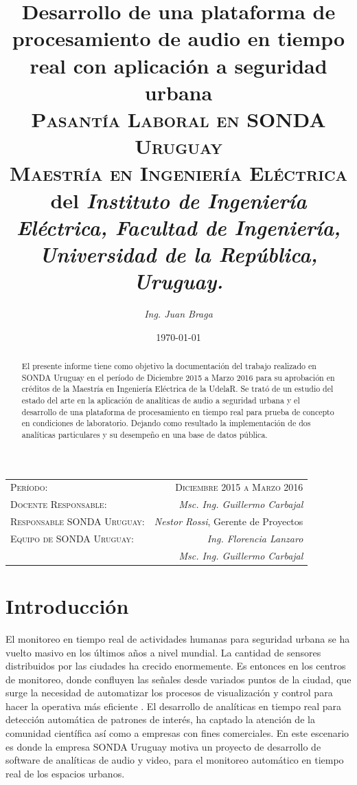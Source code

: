 \documentclass{article}
\title{\textbf{Desarrollo de una plataforma de procesamiento de audio en tiempo real con aplicación a seguridad urbana}\\ \textsc{Pasantía Laboral en SONDA Uruguay}\\
\large \textsc{Maestría en Ingeniería Eléctrica} del \textit{Instituto de Ingeniería Eléctrica, Facultad de Ingeniería, Universidad de la República, Uruguay.}}
\author{\textit{Ing. Juan Braga}}
\date{\today}
\begin{document}
\maketitle 

\begin{center}
\begin{tabular}{l r}
\medskip
\textsc{Período:} & \textsc{Diciembre 2015 a Marzo 2016}\\ %
\textsc{Docente Responsable:} & \textit{Msc. Ing. Guillermo Carbajal} \\ 
\textsc{Responsable SONDA Uruguay:} & \textit{Nestor Rossi}, Gerente de Proyectos  \\
\textsc{Equipo de SONDA Uruguay:} & \textit{Ing. Florencia Lanzaro} \\ & \textit{Msc. Ing. Guillermo Carbajal} \\ 
\end{tabular}
\end{center}


\begin{abstract}
El presente informe tiene como objetivo la documentación del trabajo realizado en SONDA Uruguay en el período de Diciembre 2015 a Marzo 2016 para su aprobación en créditos de la Maestría en Ingeniería Eléctrica de la UdelaR. Se trató de un estudio del estado del arte en la aplicación de analíticas de audio a seguridad urbana y el desarrollo de una plataforma de procesamiento en tiempo real para prueba de concepto en condiciones de laboratorio. Dejando como resultado la implementación de dos analíticas particulares y su desempeño en una base de datos pública.
\end{abstract}


\section{Introducción}
El monitoreo en tiempo real de actividades humanas para seguridad urbana se ha vuelto masivo en los últimos años a nivel mundial. La cantidad de sensores distribuidos por las ciudades ha crecido enormemente. Es entonces en los centros de monitoreo, donde confluyen las señales desde variados puntos de la ciudad, que surge la necesidad de automatizar los procesos de visualización y control para hacer la operativa más eficiente \citep{crocco2014audio}. El desarrollo de analíticas en tiempo real para detección automática de patrones de interés, ha captado la atención de la comunidad científica así como a empresas con fines comerciales. En este escenario es donde la empresa SONDA Uruguay motiva un proyecto de desarrollo de software de analíticas de audio y video, para el monitoreo automático en tiempo real de los espacios urbanos.  
\end{document}
